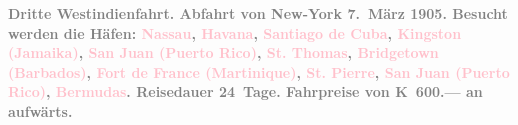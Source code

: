            \pstart
           \textcolor{gray}{\textbf{\textbf{Dritte Westindienfahrt.} Abfahrt von New-York { }\textbf{7. März 1905}. Besucht werden die Häfen: \textcolor{pink}{Nassau}{}\ledrightnote{\textcolor{pink}{Nassau}}, \textcolor{pink}{Havana}{}\ledrightnote{\textcolor{pink}{Havana}}, \textcolor{pink}{Santiago
                     de Cuba}{}\ledrightnote{\textcolor{pink}{Santiago de Cuba}}, \textcolor{pink}{Kingston (Jamaika)}{}\ledrightnote{\textcolor{pink}{Kingston}}, \textcolor{pink}{San Juan (Puerto Rico)}{}\ledrightnote{\textcolor{pink}{San Juan}}, \textcolor{pink}{St. Thomas}{}\ledrightnote{\textcolor{pink}{Saint Thomas}}, \textcolor{pink}{Bridgetown
                     (Barbados)}{}\ledrightnote{\textcolor{pink}{Bridgetown}}, \textcolor{pink}{Fort de France
                  (Martinique)}{}\ledrightnote{\textcolor{pink}{Fort-de-France}}, \textcolor{pink}{St. Pierre}{}\ledrightnote{\textcolor{pink}{Saint-Pierre}}, \textcolor{pink}{San Juan (Puerto Rico)}{}\ledrightnote{\textcolor{pink}{San Juan}}, \textcolor{pink}{Bermudas}{}\ledrightnote{\textcolor{pink}{Bermuda}}. Reisedauer 24 Tage. Fahrpreise von \textbf{K 600.—}
                  an aufwärts.}}\pend
           \pstart
